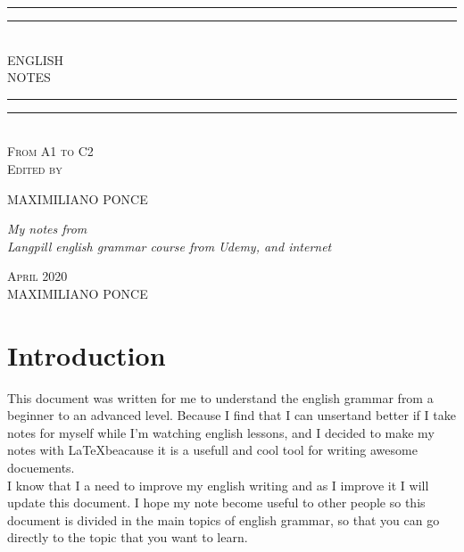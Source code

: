 \documentclass[hidelinks,10pt,a4paper]{article}
\newlength{\drop}
\begin{document}
\begin{titlepage}

\textheight
    \centering
    \vspace*{\baselineskip}
    \rule{\textwidth}{1.6pt}\vspace*{-\baselineskip}\vspace*{2pt}
    \rule{\textwidth}{0.6pt}\\[\baselineskip]
    {\LARGE ENGLISH\\[0.2\baselineskip] NOTES}\\[0.2\baselineskip]
    \rule{\textwidth}{0.4pt}\vspace*{-\baselineskip}\vspace{3.2pt}
    \rule{\textwidth}{1.6pt}\\[\baselineskip]
    \scshape
    From A1 to C2 \\
    \vspace*{2\baselineskip}
    Edited by \\[\baselineskip]
    {\Large MAXIMILIANO PONCE\par}
    {\itshape My notes from \\Langpill english grammar course from Udemy, and internet\\\par}
    \vfill
    {\scshape April 2020} \\
    {\large MAXIMILIANO PONCE}\par

\end{titlepage}

\tableofcontents
\newpage

\section{Introduction}
\indent
This document was written for me to understand the english grammar from a beginner to an advanced level. Because I find that I can unsertand better if I take notes for myself while I'm watching english lessons, and I decided to make my notes with \LaTeX  beacause it is a usefull and cool tool for writing awesome docuements.\\

\indent I know that I a need to improve my english writing and as I improve it I will update this document. I hope my note become useful to other people so this document is divided in the main topics of english grammar, so that you can go directly to the topic that you want to learn.\\
\end{document}
